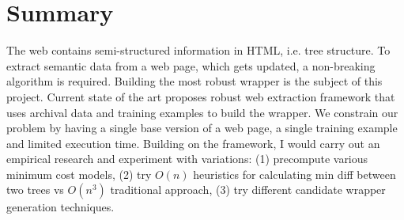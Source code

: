 \chapter{Summary}

The web contains semi-structured information in HTML, i.e. tree structure. To extract semantic data from a web page, which gets updated, a non-breaking algorithm is required. Building the most robust wrapper is the subject of this project. Current state of the art proposes robust web extraction framework that uses archival data and training examples to build the wrapper. We constrain our problem by having a single base version of a web page, a single training example and limited execution time. Building on the framework, I would carry out an empirical research and experiment with variations: (1) precompute various minimum cost models, (2) try $O(n)$ heuristics for calculating min diff between two trees vs $O(n^3)$ traditional approach, (3) try different candidate wrapper generation techniques.
